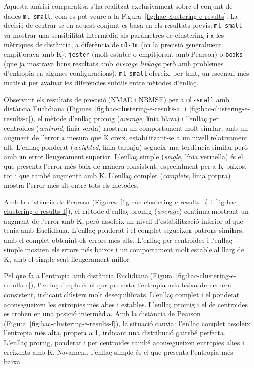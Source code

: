 \documentclass[a4paper,12pt]{report}
\begin{document}
Aquesta anàlisi comparativa s'ha realitzat exclusivament sobre el conjunt de dades \texttt{ml-small}, com es pot veure a la Figura~\ref{fig:hac-clustering-e-results}. La decisió de centrar-se en aquest conjunt es basa en els resultats previs: \texttt{ml-small} va mostrar una sensibilitat intermèdia als paràmetres de clustering i a les mètriques de distància, a diferència de \texttt{ml-1m} (on la precisió generalment empitjorava amb K), \texttt{jester} (molt estable o empitjorant amb Pearson) o \texttt{books} (que ja mostrava bons resultats amb \textit{average linkage} però amb problemes d'entropia en algunes configuracions). \texttt{ml-small} ofereix, per tant, un escenari més matisat per avaluar les diferències subtils entre mètodes d'enllaç.

Observant els resultats de precisió (NMAE i NRMSE) per a \texttt{ml-small} amb distància Euclidiana (Figures~\ref{fig:hac-clustering-e-results-a} i~\ref{fig:hac-clustering-e-results-c}), el mètode d'enllaç promig (\textit{average}, línia blava) i l'enllaç per centroides (\textit{centroid}, línia verda) mostren un comportament molt similar, amb un augment de l'error a mesura que K creix, estabilitzant-se a un nivell relativament alt. L'enllaç ponderat (\textit{weighted}, línia taronja) segueix una tendència similar però amb un error lleugerament superior. L'enllaç simple (\textit{single}, línia vermella) és el que presenta l'error més baix de manera consistent, especialment per a K baixos, tot i que també augmenta amb K. L'enllaç complet (\textit{complete}, línia porpra) mostra l'error més alt entre tots els mètodes.

Amb la distància de Pearson (Figures~\ref{fig:hac-clustering-e-results-b} i~\ref{fig:hac-clustering-e-results-d}), el mètode d'enllaç promig (\textit{average}) continua mostrant un augment de l'error amb K, però assoleix un nivell d'estabilització inferior al que tenia amb Euclidiana. L'enllaç ponderat i el complet segueixen patrons similars, amb el complet obtenint els errors més alts. L'enllaç per centroides i l'enllaç simple mostren els errors més baixos i un comportament molt estable al llarg de K, amb el simple sent lleugerament millor.

Pel que fa a l'entropia amb distància Euclidiana (Figura~\ref{fig:hac-clustering-e-results-e}), l'enllaç simple és el que presenta l'entropia més baixa de manera consistent, indicant clústers molt desequilibrats. L'enllaç complet i el ponderat aconsegueixen les entropies més altes i estables. L'enllaç promig i el de centroides es troben en una posició intermèdia. Amb la distància de Pearson (Figura~\ref{fig:hac-clustering-e-results-f}), la situació canvia: l'enllaç complet assoleix l'entropia més alta, propera a 1, indicant una distribució gairebé perfecta. L'enllaç promig, ponderat i per centroides també aconsegueixen entropies altes i creixents amb K. Novament, l'enllaç simple és el que presenta l'entropia més baixa.
\end{document}
